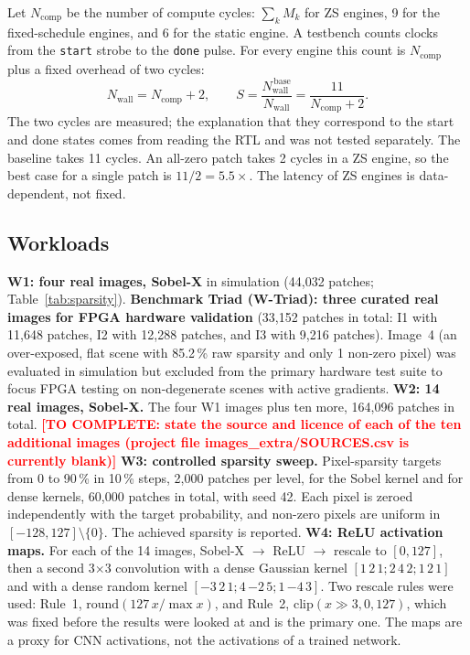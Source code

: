 \documentclass[11pt,journal,draftclsnofoot,onecolumn]{IEEEtran}
\newcommand{\todo}[1]{\textbf{\textcolor{red}{[TO COMPLETE: #1]}}}
\begin{document}
Let $N_{\mathrm{comp}}$ be the number of compute cycles: $\sum_k M_k$ for ZS engines, 9 for
the fixed-schedule engines, and 6 for the static engine. A testbench counts clocks from the
\texttt{start} strobe to the \texttt{done} pulse. For every engine this count is
$N_{\mathrm{comp}}$ plus a fixed overhead of two cycles:
\begin{equation}
N_{\mathrm{wall}}=N_{\mathrm{comp}}+2,\qquad
S=\frac{N_{\mathrm{wall}}^{\,\mathrm{base}}}{N_{\mathrm{wall}}}=\frac{11}{N_{\mathrm{comp}}+2}.
\end{equation}
The two cycles are measured; the explanation that they correspond to the start and done
states comes from reading the RTL and was not tested separately. The baseline takes 11
cycles. An all-zero patch takes 2 cycles in a ZS engine, so the best case for a single
patch is $11/2=5.5\times$. The latency of ZS engines is data-dependent, not fixed.

\subsection{Workloads}\label{sec:m-workloads}
\textbf{W1: four real images, Sobel-X} in simulation (44{,}032 patches; Table~\ref{tab:sparsity}).
\textbf{Benchmark Triad (W-Triad): three curated real images for FPGA hardware validation} (33{,}152 patches in total: I1 with 11{,}648 patches, I2 with 12{,}288 patches, and I3 with 9{,}216 patches). Image~4 (an over-exposed, flat scene with 85.2\,\% raw sparsity and only 1 non-zero pixel) was evaluated in simulation but excluded from the primary hardware test suite to focus FPGA testing on non-degenerate scenes with active gradients.
\textbf{W2: 14 real images, Sobel-X.} The four W1 images plus ten more, 164{,}096 patches
in total. \todo{state the source and licence of each of the ten additional images
(project file images\_extra/SOURCES.csv is currently blank)}
\textbf{W3: controlled sparsity sweep.} Pixel-sparsity targets from 0 to 90\,\% in 10\,\%
steps, 2{,}000 patches per level, for the Sobel kernel and for dense kernels, 60{,}000
patches in total, with seed 42. Each pixel is zeroed independently with the target
probability, and non-zero pixels are uniform in $[-128,127]\setminus\{0\}$. The achieved
sparsity is reported.
\textbf{W4: ReLU activation maps.} For each of the 14 images, Sobel-X $\rightarrow$ ReLU
$\rightarrow$ rescale to $[0,127]$, then a second 3$\times$3 convolution with a dense
Gaussian kernel $[1\,2\,1;2\,4\,2;1\,2\,1]$ and with a dense random kernel
$[-3\,2\,1;4\,{-2}\,5;1\,{-4}\,3]$. Two rescale rules were used: Rule~1,
$\mathrm{round}(127\,x/\max x)$, and Rule~2, $\mathrm{clip}(x\gg3,0,127)$, which was fixed
before the results were looked at and is the primary one. The maps are a proxy for CNN
activations, not the activations of a trained network.
\end{document}
